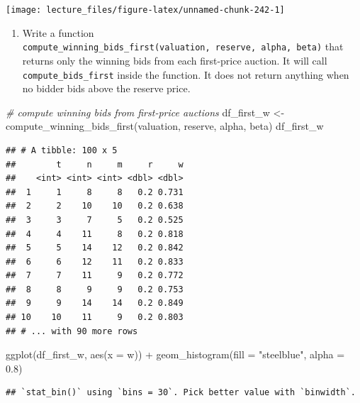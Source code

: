 \documentclass[
]{book}
\newenvironment{Shaded}{\begin{snugshade}}{\end{snugshade}}
\newcommand{\AttributeTok}[1]{\textcolor[rgb]{0.77,0.63,0.00}{#1}}
\newcommand{\CommentTok}[1]{\textcolor[rgb]{0.56,0.35,0.01}{\textit{#1}}}
\newcommand{\FloatTok}[1]{\textcolor[rgb]{0.00,0.00,0.81}{#1}}
\newcommand{\FunctionTok}[1]{\textcolor[rgb]{0.00,0.00,0.00}{#1}}
\newcommand{\NormalTok}[1]{#1}
\newcommand{\OtherTok}[1]{\textcolor[rgb]{0.56,0.35,0.01}{#1}}
\newcommand{\SpecialCharTok}[1]{\textcolor[rgb]{0.00,0.00,0.00}{#1}}
\newcommand{\StringTok}[1]{\textcolor[rgb]{0.31,0.60,0.02}{#1}}
\providecommand{\tightlist}{%
  \setlength{\itemsep}{0pt}\setlength{\parskip}{0pt}}
\begin{document}
\begin{center}\texttt{[image: lecture\_files/figure-latex/unnamed-chunk-242-1]} \end{center}

\begin{enumerate}
\def\labelenumi{\arabic{enumi}.}
\setcounter{enumi}{5}
\tightlist
\item
  Write a function \texttt{compute\_winning\_bids\_first(valuation,\ reserve,\ alpha,\ beta)} that returns only the winning bids from each first-price auction. It will call \texttt{compute\_bids\_first} inside the function. It does not return anything when no bidder bids above the reserve price.
\end{enumerate}

\begin{Shaded}
\begin{Highlighting}[]
\CommentTok{\# compute winning bids from first{-}price auctions}
\NormalTok{df\_first\_w }\OtherTok{\textless{}{-}}
  \FunctionTok{compute\_winning\_bids\_first}\NormalTok{(valuation, reserve, alpha, beta)}
\NormalTok{df\_first\_w}
\end{Highlighting}
\end{Shaded}

\begin{verbatim}
## # A tibble: 100 x 5
##        t     n     m     r     w
##    <int> <int> <int> <dbl> <dbl>
##  1     1     8     8   0.2 0.731
##  2     2    10    10   0.2 0.638
##  3     3     7     5   0.2 0.525
##  4     4    11     8   0.2 0.818
##  5     5    14    12   0.2 0.842
##  6     6    12    11   0.2 0.833
##  7     7    11     9   0.2 0.772
##  8     8     9     9   0.2 0.753
##  9     9    14    14   0.2 0.849
## 10    10    11     9   0.2 0.803
## # ... with 90 more rows
\end{verbatim}

\begin{Shaded}
\begin{Highlighting}[]
\FunctionTok{ggplot}\NormalTok{(df\_first\_w, }\FunctionTok{aes}\NormalTok{(}\AttributeTok{x =}\NormalTok{ w)) }\SpecialCharTok{+} \FunctionTok{geom\_histogram}\NormalTok{(}\AttributeTok{fill =} \StringTok{"steelblue"}\NormalTok{, }\AttributeTok{alpha =} \FloatTok{0.8}\NormalTok{)}
\end{Highlighting}
\end{Shaded}

\begin{verbatim}
## `stat_bin()` using `bins = 30`. Pick better value with `binwidth`.
\end{verbatim}
\end{document}
